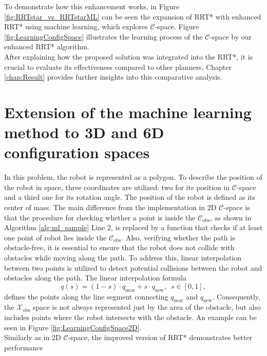\documentclass{ctuthesis}
\begin{document}
\vspace{1em}
\noindent To demonstrate how this enhancement works, 
in Figure \ref{fig:RRTstar_vs_RRTstarML} can be seen 
the expansion of RRT* with enhanced RRT* using 
machine learning, which explores $\mathcal{C}$-space. 
Figure \ref{fig:LearningConfigSpace} illustrates 
the learning process of the $\mathcal{C}$-space by our enhanced RRT* algorithm.
\\[12pt]
After explaining how the proposed solution was integrated into the RRT*, 
it is crucial to evaluate its effectiveness compared to other planners. 
Chapter \ref{chap:Result} provides further insights into this comparative analysis.
\section{Extension of the machine learning method to 3D and 6D configuration spaces}
In this problem, the robot is represented as a polygon. 
To describe the position of the robot in space, three coordinates are utilized: 
two for its position in $\mathcal{C}$-space and 
a third one for its rotation angle. 
The position of the robot is defined as its center of mass.
The main difference from the implementation in 2D $\mathcal{C}$-space is that 
the procedure for checking whether a point is inside the $\mathcal{C}_\text{obs}$,
as shown in Algorithm \ref{alg:ml_sample} Line 2,
is replaced by a function that checks if 
at least one point of robot lies inside the $\mathcal{C}_\text{obs}$. 
Also, verifying whether the path is obstacle-free, 
it is essential to ensure that 
the robot does not collide with obstacles while moving along the path.
To address this, 
linear interpolation between two points is utilized 
to detect potential collisions between the robot and obstacles along the path.
The linear interpolation formula \[ q(s) = (1 - s) \cdot q_{\text{near}} + s \cdot q_{\text{new}},\enspace s \in [0,1], \] 
defines the points along the line segment connecting \( q_{\text{near}} \) and \( q_{\text{new}} \).
Consequently, the $\mathcal{X}_\text{obs}$ space is not always represented just by the 
area of the obstacle, but also includes points where the robot intersects 
with the obstacle. 
An example can be seen in Figure \ref{fig:LearningConfigSpace2D}.
\\[12pt]
Similarly as in 2D $\mathcal{C}$-space, 
the improved version of RRT* demonstrates better performance 
\end{document}
